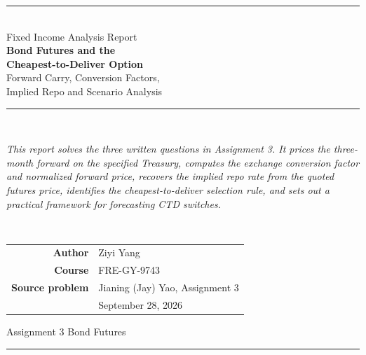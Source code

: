 \documentclass[11pt]{article}
\numberwithin{equation}{section}
\begin{document}
\setlength{\abovedisplayskip}{7pt}
\setlength{\belowdisplayskip}{7pt}
\setlength{\abovedisplayshortskip}{3pt}
\setlength{\belowdisplayshortskip}{4pt}
\setlength{\jot}{2pt}
\hypersetup{pageanchor=false}

\begin{titlepage}
\thispagestyle{empty}
\centering
\vspace*{0.55in}
{\color{NYUviolet}\rule{\textwidth}{2.2pt}}\\[10pt]
{\sffamily\fontsize{16}{19}\selectfont\color{inkgrey}
Fixed Income Analysis Report}\\[14pt]
{\sffamily\bfseries\fontsize{25}{30}\selectfont\color{NYUviolet}
Bond Futures and the\\[3pt]Cheapest-to-Deliver Option}\\[14pt]
{\sffamily\fontsize{15}{18}\selectfont\color{inkgrey}
Forward Carry, Conversion Factors,\\[3pt]
Implied Repo and Scenario Analysis}\\[10pt]
{\color{NYUviolet}\rule{\textwidth}{2.2pt}}\\[28pt]

\begin{minipage}{0.88\textwidth}
\centering\itshape\small\color{inkgrey}
This report solves the three written questions in Assignment 3. It prices the
three-month forward on the specified Treasury, computes the exchange conversion
factor and normalized forward price, recovers the implied repo rate from the
quoted futures price, identifies the cheapest-to-deliver selection rule, and
sets out a practical framework for forecasting CTD switches.
\end{minipage}\\[34pt]

\begin{tabular}{rl}
\sffamily\bfseries Author & Ziyi Yang\\[3pt]
\sffamily\bfseries Course & FRE-GY-9743\\[3pt]
\sffamily\bfseries Source problem & Jianing (Jay) Yao, Assignment 3\\[3pt]
 & September 28, 2026
\end{tabular}

\vfill
{\sffamily\small\color{inkgrey}Assignment 3 \quad\textbullet\quad Bond Futures}\\[2pt]
{\color{NYUviolet}\rule{\textwidth}{1.2pt}}
\end{titlepage}
\hypersetup{pageanchor=true}
\end{document}
